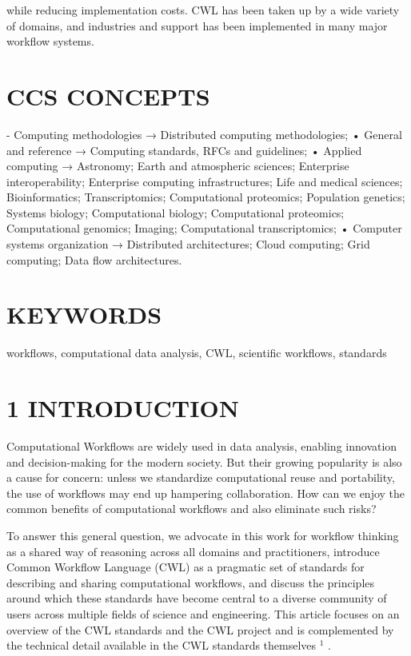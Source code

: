 \documentclass[
]{article}
\begin{document}
while reducing implementation costs. CWL has been taken up by a wide
variety of domains, and industries and support has been implemented in
many major workflow systems.

\section{CCS CONCEPTS}\label{ccs-concepts}

- Computing methodologies → Distributed computing methodologies; •
General and reference → Computing standards, RFCs and guidelines; •
Applied computing → Astronomy; Earth and atmospheric sciences;
Enterprise interoperability; Enterprise computing infrastructures; Life
and medical sciences; Bioinformatics; Transcriptomics; Computational
proteomics; Population genetics; Systems biology; Computational biology;
Computational proteomics; Computational genomics; Imaging; Computational
transcriptomics; • Computer systems organization → Distributed
architectures; Cloud computing; Grid computing; Data flow architectures.

\section{KEYWORDS}\label{keywords}

workflows, computational data analysis, CWL, scientific workflows,
standards

\section{1 INTRODUCTION}\label{introduction}

Computational Workflows are widely used in data analysis, enabling
innovation and decision-making for the modern society. But their growing
popularity is also a cause for concern: unless we standardize
computational reuse and portability, the use of workflows may end up
hampering collaboration. How can we enjoy the common benefits of
computational workflows and also eliminate such risks?

To answer this general question, we advocate in this work for workflow
thinking as a shared way of reasoning across all domains and
practitioners, introduce Common Workflow Language (CWL) as a pragmatic
set of standards for describing and sharing computational workflows, and
discuss the principles around which these standards have become central
to a diverse community of users across multiple fields of science and
engineering. This article focuses on an overview of the CWL standards
and the CWL project and is complemented by the technical detail
available in the CWL standards themselves \(^{1}\) .
\end{document}
